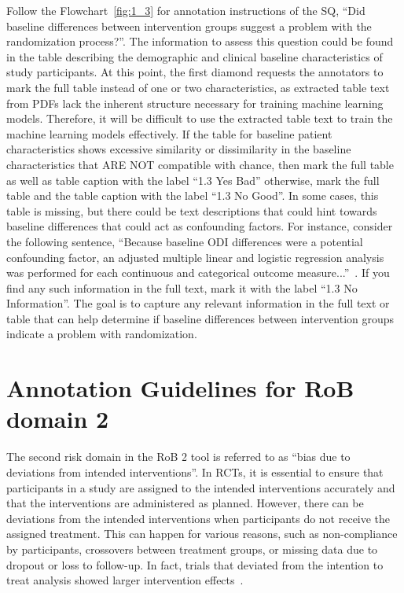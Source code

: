 \documentclass[sn-mathphys,Numbered]{sn-jnl}%
\begin{document}
Follow the Flowchart~\ref{fig:1_3} for annotation instructions of the SQ, ``Did baseline differences between intervention groups suggest a problem with the randomization process?''.
The information to assess this question could be found in the table describing the demographic and clinical baseline characteristics of study participants. 
At this point, the first diamond requests the annotators to mark the full table instead of one or two characteristics, as extracted table text from PDFs lack the inherent structure necessary for training machine learning models.
Therefore, it will be difficult to use the extracted table text to train the machine learning models effectively. 
If the table for baseline patient characteristics shows excessive similarity or dissimilarity in the baseline characteristics that ARE NOT compatible with chance, then mark the full table as well as table caption with the label ``1.3 Yes Bad'' otherwise, mark the full table and the table caption with the label ``1.3 No Good''.
In some cases, this table is missing, but there could be text descriptions that could hint towards baseline differences that could act as confounding factors.
For instance, consider the following sentence, ``Because baseline ODI differences were a potential confounding factor, an adjusted multiple linear and logistic regression analysis was performed for each continuous and categorical outcome measure...''~\citep{cohen2008randomized}.
If you find any such information in the full text, mark it with the label ``1.3 No Information''.
The goal is to capture any relevant information in the full text or table that can help determine if baseline differences between intervention groups indicate a problem with randomization.
%
%
%
\section*{Annotation Guidelines for RoB domain 2}
\label{sec:dom2}
%
The second risk domain in the RoB 2 tool is referred to as ``bias due to deviations from intended interventions''.
In RCTs, it is essential to ensure that participants in a study are assigned to the intended interventions accurately and that the interventions are administered as planned.
However, there can be deviations from the intended interventions when participants do not receive the assigned treatment.
This can happen for various reasons, such as non-compliance by participants, crossovers between treatment groups, or missing data due to dropout or loss to follow-up.
In fact, trials that deviated from the intention to treat analysis showed larger intervention effects~\cite{abraha2015deviation}.
\end{document}
